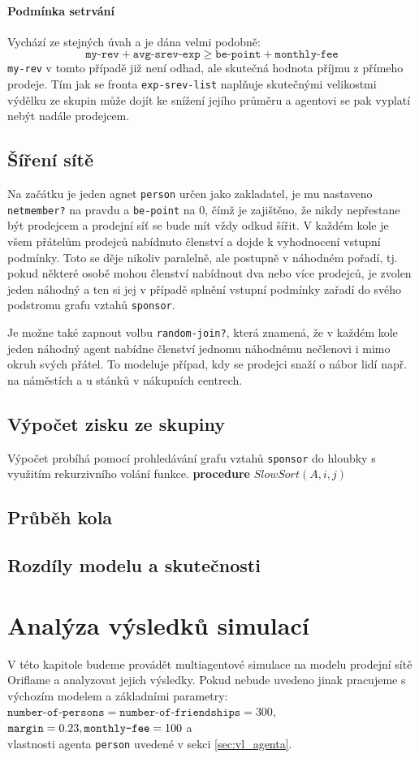 \documentclass[a4wide,12pt]{report}
\begin{document}
\subsubsection{Podmínka setrvání}
Vychází ze stejných úvah a je dána velmi podobně:
\[ \texttt{my-rev} + \texttt{avg-srev-exp} \geq \texttt{be-point} + \texttt{monthly-fee} \]
\texttt{my-rev} v tomto případě již není odhad, ale skutečná hodnota příjmu z přímeho prodeje. Tím jak se fronta \texttt{exp-srev-list} naplňuje skutečnými velikostmi výdělku ze skupin může dojít ke snížení jejího průměru a agentovi se pak vyplatí nebýt nadále prodejcem.
\section{Šíření sítě}
Na začátku je jeden agnet \texttt{person} určen jako zakladatel, je mu nastaveno \texttt{netmember?} na pravdu a \texttt{be-point} na 0, čímž je zajištěno, že nikdy nepřestane být prodejcem a prodejní síť se bude mít vždy odkud šířit. V každém kole je všem přátelům prodejců nabídnuto členství a dojde k vyhodnocení vstupní podmínky. Toto se děje nikoliv paralelně, ale postupně v náhodném pořadí, tj. pokud některé osobě mohou členství nabídnout dva nebo více prodejců, je zvolen jeden náhodný a ten si jej v případě splnění vstupní podmínky zařadí do svého podstromu grafu vztahů \texttt{sponsor}.

Je možne také zapnout volbu \texttt{random-join?}, která znamená, že v každém kole jeden náhodný agent nabídne členství jednomu náhodnému nečlenovi i mimo okruh svých přátel. To modeluje případ, kdy se prodejci snaží o nábor lidí např. na náměstích a u stánků v nákupních centrech.
\section{Výpočet zisku ze skupiny}
Výpočet probíhá pomocí prohledávání grafu vztahů \texttt{sponsor} do hloubky s využitím rekurzivního volání funkce.
{\bf procedure} $SlowSort(A,i,j)$
\section{Průběh kola}
\section{Rozdíly modelu a skutečnosti}
%
%
%
\chapter{Analýza výsledků simulací}
V této kapitole budeme provádět multiagentové simulace na modelu prodejní sítě Oriflame a analyzovat jejich výsledky. Pokud nebude uvedeno jinak pracujeme s výchozím modelem a základními parametry:\\
$\texttt{number-of-persons}=\texttt{number-of-friendships}=300$, \\
$\texttt{margin}=0.23,\\\texttt{monthly-fee}=100$ a\\
vlastnosti agenta \texttt{person} uvedené v sekci \ref{sec:vl_agenta}.
\end{document}
